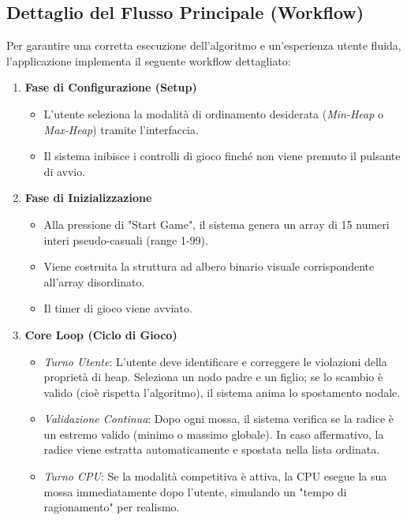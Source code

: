 \documentclass[openany]{theme/uniprthesis}
\begin{document}
\subsection{Dettaglio del Flusso Principale (Workflow)}
Per garantire una corretta esecuzione dell'algoritmo e un'esperienza utente fluida, l'applicazione implementa il seguente workflow dettagliato:

\begin{enumerate}
    \item \textbf{Fase di Configurazione (Setup)}
    \begin{itemize}
        \item L'utente seleziona la modalità di ordinamento desiderata (\textit{Min-Heap} o \textit{Max-Heap}) tramite l'interfaccia.
        \item Il sistema inibisce i controlli di gioco finché non viene premuto il pulsante di avvio.
    \end{itemize}

    \item \textbf{Fase di Inizializzazione}
    \begin{itemize}
        \item Alla pressione di "Start Game", il sistema genera un array di 15 numeri interi pseudo-casuali (range 1-99).
        \item Viene costruita la struttura ad albero binario visuale corrispondente all'array disordinato.
        \item Il timer di gioco viene avviato.
    \end{itemize}

    \item \textbf{Core Loop (Ciclo di Gioco)}
    \begin{itemize}
        \item \textit{Turno Utente}: L'utente deve identificare e correggere le violazioni della proprietà di heap. Seleziona un nodo padre e un figlio; se lo scambio è valido (cioè rispetta l'algoritmo), il sistema anima lo spostamento nodale.
        \item \textit{Validazione Continua}: Dopo ogni mossa, il sistema verifica se la radice è un estremo valido (minimo o massimo globale). In caso affermativo, la radice viene estratta automaticamente e spostata nella lista ordinata.
        \item \textit{Turno CPU}: Se la modalità competitiva è attiva, la CPU esegue la sua mossa immediatamente dopo l'utente, simulando un "tempo di ragionamento" per realismo.
    \end{itemize}


\end{enumerate}
\end{document}
